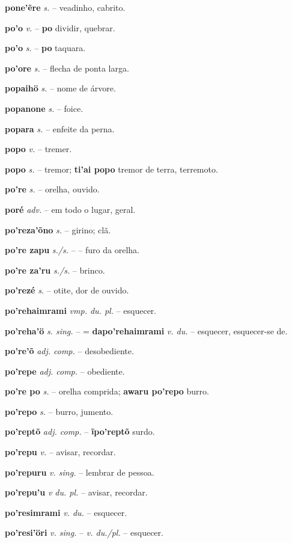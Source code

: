 \textbf{pone'ẽre} \textit{s.} -- veadinho, cabrito.

\textbf{po'o} \textit{v.} -- \textbf{po} dividir, quebrar.

\textbf{po'o} \textit{s.} -- \textbf{po} taquara.

\textbf{po'ore} \textit{s.} -- flecha de ponta larga.

\textbf{popaihö} \textit{s.} -- nome de árvore.

\textbf{popanone} \textit{s.} -- foice.

\textbf{popara} \textit{s.} -- enfeite da perna.

\textbf{popo} \textit{v.} -- tremer.

\textbf{popo} \textit{s.} -- tremor; \textbf{ti'ai popo} tremor de terra, terremoto.

\textbf{po're} \textit{s.} -- orelha, ouvido.

\textbf{poré} \textit{adv.} -- em todo o lugar, geral.

\textbf{po'reza'õno} \textit{s.} -- girino; clã.

\textbf{po're zapu} \textit{s./s.} -- -- furo da orelha.

\textbf{po're za'ru} \textit{s./s.} -- brinco.

\textbf{po'rezé} \textit{s.} -- otite, dor de ouvido.

\textbf{po'rehaimrami} \textit{vmp. du. pl.} -- esquecer.

\textbf{po'reha'ö} \textit{s. sing.} -- = \textbf{dapo'rehaimrami} \textit{v. du.} -- esquecer, esquecer-se de.

\textbf{po're'õ} \textit{adj. comp.} -- desobediente.

\textbf{po'repe} \textit{adj. comp.} -- obediente.

\textbf{po're po} \textit{s.} -- orelha comprida; \textbf{awaru po'repo} burro.

\textbf{po'repo} \textit{s.} -- burro, jumento.

\textbf{po'reptõ} \textit{adj. comp.} -- \textbf{ĩpo'reptõ} surdo.

\textbf{po'repu} \textit{v.} -- avisar, recordar.

\textbf{po'repuru} \textit{v. sing.} -- lembrar de pessoa.

\textbf{po'repu'u} \textit{v du. pl.} -- avisar, recordar.

\textbf{po'resimrami} \textit{v. du.} -- esquecer.

\textbf{po'resi'öri} \textit{v. sing.} -- \textit{v. du./pl.} -- esquecer.

